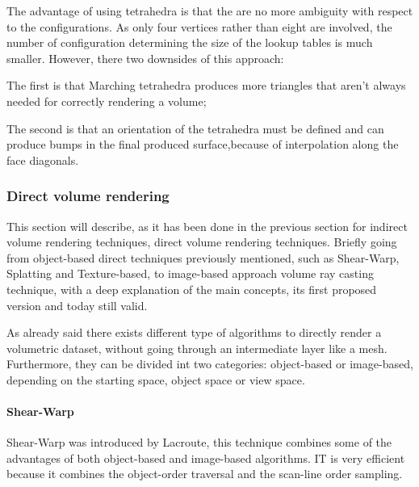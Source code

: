 \documentclass[12pt,a4paper]{extarticle}
\begin{document}
The advantage of using tetrahedra is that the are no more ambiguity with respect to the configurations. As only four vertices rather than eight are involved, the number of configuration determining the size of the lookup tables is much smaller. However, there two downsides of this approach:

The first  is that Marching tetrahedra produces more triangles that aren't always needed for correctly rendering a volume; 

The second is that an orientation of the tetrahedra must be defined and can produce bumps in the final produced surface,because of interpolation along the face diagonals.

\subsubsection{Direct volume rendering} %
This section will describe, as it has been done in the previous section for indirect volume rendering techniques, direct volume rendering techniques. Briefly going from object-based direct techniques previously mentioned, such as Shear-Warp, Splatting and Texture-based, to image-based approach volume ray casting technique, with a deep explanation of the main concepts, its first proposed version and today still valid.

As already said there exists different type of algorithms to directly render a volumetric dataset, without going through an intermediate layer like a mesh.
Furthermore, they can be divided int two categories: object-based or image-based, depending on the starting space, object space or view space.

\paragraph{Shear-Warp} Shear-Warp was introduced by Lacroute, %
this technique combines some of the advantages of both object-based and image-based algorithms. IT is very efficient because it combines the object-order traversal and the scan-line order sampling.
\end{document}

